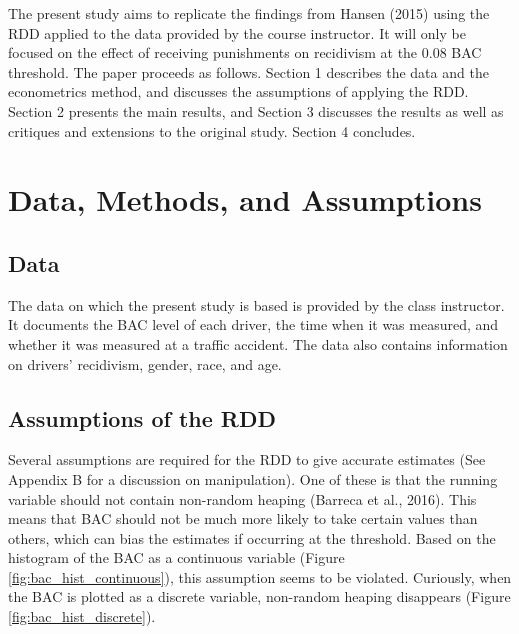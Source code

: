 \documentclass[
  11pt,
]{article}
\begin{document}
The present study aims to replicate the findings from Hansen (2015)
using the RDD applied to the data provided by the course instructor. It
will only be focused on the effect of receiving punishments on
recidivism at the 0.08 BAC threshold. The paper proceeds as follows.
Section 1 describes the data and the econometrics method, and discusses
the assumptions of applying the RDD. Section 2 presents the main
results, and Section 3 discusses the results as well as critiques and
extensions to the original study. Section 4 concludes.

\hypertarget{data-methods-and-assumptions}{%
\section{Data, Methods, and
Assumptions}\label{data-methods-and-assumptions}}

\hypertarget{data}{%
\subsection{Data}\label{data}}

The data on which the present study is based is provided by the class
instructor. It documents the BAC level of each driver, the time when it
was measured, and whether it was measured at a traffic accident. The
data also contains information on drivers' recidivism, gender, race, and
age.

\hypertarget{assumptions-of-the-rdd}{%
\subsection{Assumptions of the RDD}\label{assumptions-of-the-rdd}}

Several assumptions are required for the RDD to give accurate estimates
(See Appendix B for a discussion on manipulation). One of these is that
the running variable should not contain non-random heaping (Barreca et
al., 2016). This means that BAC should not be much more likely to take
certain values than others, which can bias the estimates if occurring at
the threshold. Based on the histogram of the BAC as a continuous
variable (Figure \ref{fig:bac_hist_continuous}), this assumption seems
to be violated. Curiously, when the BAC is plotted as a discrete
variable, non-random heaping disappears (Figure
\ref{fig:bac_hist_discrete}).
\end{document}
